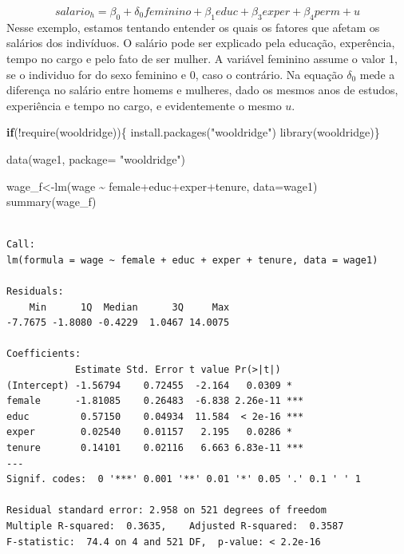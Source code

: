 \documentclass[
  letterpaper,
  DIV=11,
  numbers=noendperiod]{scrreprt}
\newenvironment{Shaded}{\begin{snugshade}}{\end{snugshade}}
\newcommand{\AttributeTok}[1]{\textcolor[rgb]{0.40,0.45,0.13}{#1}}
\newcommand{\ControlFlowTok}[1]{\textcolor[rgb]{0.00,0.23,0.31}{\textbf{#1}}}
\newcommand{\FunctionTok}[1]{\textcolor[rgb]{0.28,0.35,0.67}{#1}}
\newcommand{\NormalTok}[1]{\textcolor[rgb]{0.00,0.23,0.31}{#1}}
\newcommand{\OtherTok}[1]{\textcolor[rgb]{0.00,0.23,0.31}{#1}}
\newcommand{\SpecialCharTok}[1]{\textcolor[rgb]{0.37,0.37,0.37}{#1}}
\newcommand{\StringTok}[1]{\textcolor[rgb]{0.13,0.47,0.30}{#1}}
\begin{document}
\[salario_h = \beta_0 + \delta_0 feminino + \beta_1 educ + \beta_3 exper + \beta_4perm + u \]
Nesse exemplo, estamos tentando entender os quais os fatores que afetam
os salários dos indivíduos. O salário pode ser explicado pela educação,
experência, tempo no cargo e pelo fato de ser mulher. A variável
feminino assume o valor 1, se o individuo for do sexo feminino e 0, caso
o contrário. Na equação \(\delta_0\) mede a diferença no salário entre
homems e mulheres, dado os mesmos anos de estudos, experiência e tempo
no cargo, e evidentemente o mesmo \(u\).

\begin{Shaded}
\begin{Highlighting}[]
\ControlFlowTok{if}\NormalTok{(}\SpecialCharTok{!}\FunctionTok{require}\NormalTok{(wooldridge))\{}
    \FunctionTok{install.packages}\NormalTok{(}\StringTok{"wooldridge"}\NormalTok{)}
    \FunctionTok{library}\NormalTok{(wooldridge)\}}

\FunctionTok{data}\NormalTok{(wage1, }\AttributeTok{package=} \StringTok{"wooldridge"}\NormalTok{)}

\NormalTok{wage\_f}\OtherTok{\textless{}{-}}\FunctionTok{lm}\NormalTok{(wage }\SpecialCharTok{\textasciitilde{}}\NormalTok{ female}\SpecialCharTok{+}\NormalTok{educ}\SpecialCharTok{+}\NormalTok{exper}\SpecialCharTok{+}\NormalTok{tenure, }\AttributeTok{data=}\NormalTok{wage1)}
\FunctionTok{summary}\NormalTok{(wage\_f)}
\end{Highlighting}
\end{Shaded}

\begin{verbatim}

Call:
lm(formula = wage ~ female + educ + exper + tenure, data = wage1)

Residuals:
    Min      1Q  Median      3Q     Max 
-7.7675 -1.8080 -0.4229  1.0467 14.0075 

Coefficients:
            Estimate Std. Error t value Pr(>|t|)    
(Intercept) -1.56794    0.72455  -2.164   0.0309 *  
female      -1.81085    0.26483  -6.838 2.26e-11 ***
educ         0.57150    0.04934  11.584  < 2e-16 ***
exper        0.02540    0.01157   2.195   0.0286 *  
tenure       0.14101    0.02116   6.663 6.83e-11 ***
---
Signif. codes:  0 '***' 0.001 '**' 0.01 '*' 0.05 '.' 0.1 ' ' 1

Residual standard error: 2.958 on 521 degrees of freedom
Multiple R-squared:  0.3635,    Adjusted R-squared:  0.3587 
F-statistic:  74.4 on 4 and 521 DF,  p-value: < 2.2e-16
\end{verbatim}
\end{document}
